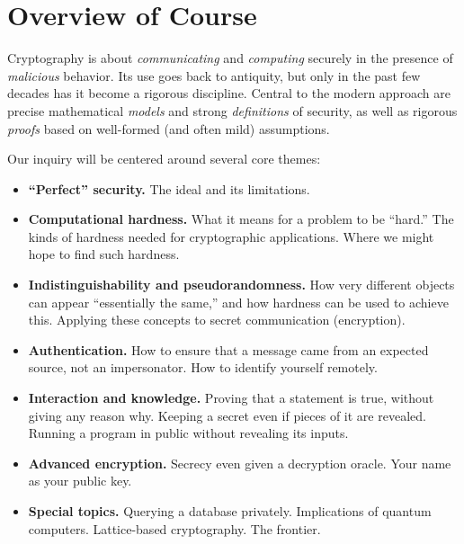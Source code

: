 \documentclass[11pt]{article}
\begin{document}
\thispagestyle{fancy}           %


\section{Overview of Course}
\label{sec:overview-course}

Cryptography is about \emph{communicating} and \emph{computing}
securely in the presence of \emph{malicious} behavior.  Its use goes
back to antiquity, but only in the past few decades has it become a
rigorous discipline.  Central to the modern approach are precise
mathematical \emph{models} and strong \emph{definitions} of security,
as well as rigorous \emph{proofs} based on well-formed (and often
mild) assumptions.

\medskip \noindent
Our inquiry will be centered around several core themes: 
\begin{itemize}
\item \textbf{``Perfect'' security.}  The ideal and its limitations.

\item \textbf{Computational hardness.}  What it means for a problem to
  be ``hard.''  The kinds of hardness needed for cryptographic
  applications.  Where we might hope to find such hardness.

\item \textbf{Indistinguishability and pseudorandomness.}  How very
  different objects can appear ``essentially the same,'' and how
  hardness can be used to achieve this.  Applying these concepts to
  secret communication (encryption).

\item \textbf{Authentication.}  How to ensure that a message came from
  an expected source, not an impersonator.  How to identify yourself
  remotely.

\item \textbf{Interaction and knowledge.}  Proving that a statement is
  true, without giving any reason why.  Keeping a secret even if
  pieces of it are revealed.  Running a program in public without
  revealing its inputs.

\item \textbf{Advanced encryption.}  Secrecy even given a decryption
  oracle.  Your name as your public key.

\item \textbf{Special topics.}  Querying a database privately.
  Implications of quantum computers.  Lattice-based cryptography.  The
  frontier.
\end{itemize}
\end{document}
